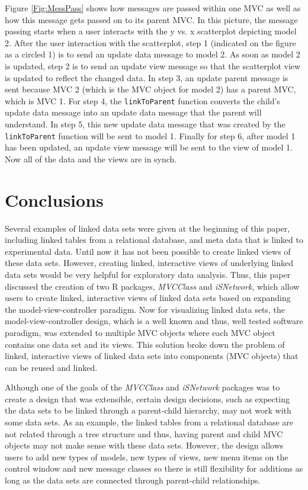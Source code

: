 \documentclass{article}[11pt]
\newcommand{\Rfunction}[1]{{\texttt{#1}}}
\newcommand{\Rpackage}[1]{{\textit{#1}}}
\begin{document}
Figure \ref{Fig:MessPass} shows how messages are passed within one MVC as well
as how this message gets passed on to its parent MVC.  In this picture, the
message passing starts when a user interacts with the y vs. x scatterplot
depicting model 2.  After the user interaction with the scatterplot, step 1
(indicated on the figure as a circled 1) is to send an update data message to
model 2.  As soon as model 2 is updated, step 2 is to send an update view
message so that the scatterplot view is updated to reflect the changed data.
In step 3, an update parent message is sent because MVC 2 (which is the MVC
object for model 2) has a parent MVC, which is MVC 1.  For step 4, the
\Rfunction{linkToParent} function converts the child's update data message
into an update data message that the parent will understand.  In step 5, this
new update data message that was created by the \Rfunction{linkToParent}
function will be sent to model 1.  Finally for step 6, after model 1 has been
updated, an update view message will be sent to the view of model 1.  Now all
of the data and the views are in synch.

\section{Conclusions}\label{Sec:Conc}

Several examples of linked data sets were given at the beginning of this
paper, including linked tables from a relational database, and meta data that
is linked to experimental data.  Until now it has not been possible to create
linked views of these data sets.  However, creating linked, interactive views
of underlying linked data sets would be very helpful for exploratory data
analysis.  Thus, this paper discussed the creation of two R packages,
\Rpackage{MVCClass} and \Rpackage{iSNetwork}, which allow users to create
linked, interactive views of linked data sets based on expanding the
model-view-controller paradigm.  Now for visualizing linked data sets, the
model-view-controller design, which is a well known and thus, well tested
software paradigm, was extended to multiple MVC objects where each MVC object
contains one data set and its views.  This solution broke down the problem of
linked, interactive views of linked data sets into components (MVC objects)
that can be reused and linked.  

Although one of the goals of the \Rpackage{MVCClass} and
\Rpackage{iSNetwork} packages was to create a design that was extensible,
certain design decisions, such as expecting the data sets to be linked through
a parent-child hierarchy, may not work with some data sets.  As an example,
the linked tables from a relational database are not related through a tree
structure and thus, having parent and child MVC objects may not make sense
with these data sets.  However, the design allows users to add new
types of models, new types of views, new menu items on the control window and
new message classes so there is still flexibility for additions as long as the
data sets are connected through parent-child relationships. 
\end{document}
